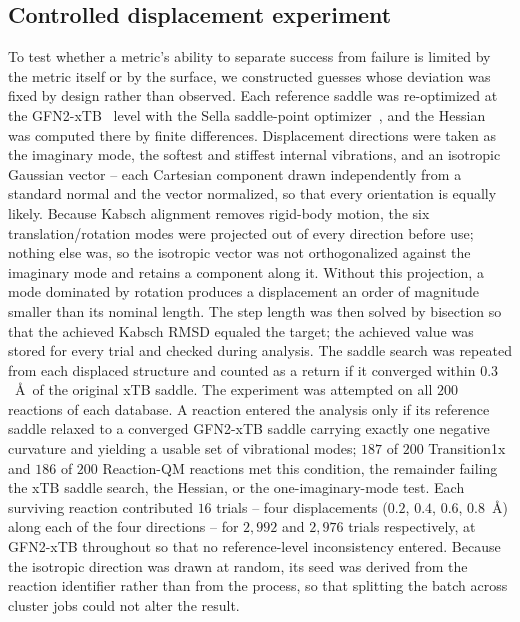 \documentclass[11pt]{article}
\begin{document}
\subsection{Controlled displacement experiment}
\label{sec:methods-ladder}
To test whether a metric's ability to separate success from failure is limited by
the metric itself or by the surface, we constructed guesses whose deviation was
fixed by design rather than observed. Each reference saddle was re-optimized at the GFN2-xTB~\cite{Bannwarth2019}
level with the Sella saddle-point optimizer~\cite{Hermes2022}, and the Hessian was
computed there by finite differences. Displacement directions were taken as the imaginary mode, the softest
and stiffest internal vibrations, and an isotropic Gaussian vector -- each
Cartesian component drawn independently from a standard normal and the vector
normalized, so that every orientation is equally likely. Because Kabsch alignment removes rigid-body motion, the six translation/rotation
modes were projected out of every direction before use; nothing else was, so the
isotropic vector was not orthogonalized against the imaginary mode and retains a
component along it. Without this projection, a
mode dominated by rotation produces a displacement an order of magnitude smaller
than its nominal length. The step length was then solved by bisection so that the achieved Kabsch
RMSD equaled the target; the achieved value was stored for every trial and checked
during analysis. The saddle search was repeated from each displaced structure and
counted as a return if it converged within $0.3$~\AA\ of the original xTB saddle.
The experiment was attempted on all $200$ reactions of each database. A reaction
entered the analysis only if its reference saddle relaxed to a converged GFN2-xTB
saddle carrying exactly one negative curvature and yielding a usable set of
vibrational modes; $187$ of $200$ Transition1x and $186$ of $200$ Reaction-QM
reactions met this condition, the remainder failing the xTB saddle search, the
Hessian, or the one-imaginary-mode test. Each surviving reaction contributed
$16$ trials -- four displacements ($0.2$, $0.4$, $0.6$, $0.8$~\AA) along each of
the four directions -- for $2{,}992$ and $2{,}976$ trials respectively, at GFN2-xTB
throughout so that no reference-level inconsistency entered. Because the isotropic direction was drawn at random, its
seed was derived from the reaction identifier rather than from the process, so
that splitting the batch across cluster jobs could not alter the result.
\end{document}
